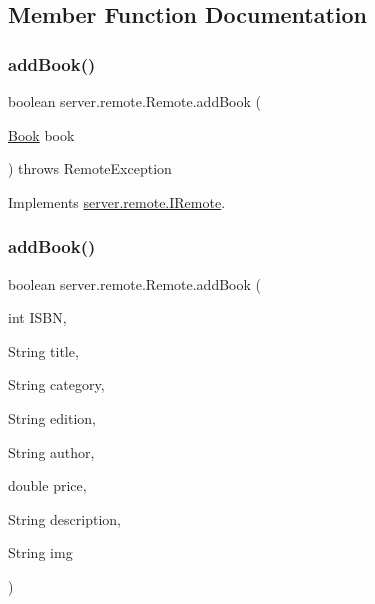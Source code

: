 \subsection{Member Function Documentation}
\mbox{\label{classserver_1_1remote_1_1_remote_a496fcecd259c1b527ffba62fc452afee}} 
\subsubsection{\texorpdfstring{add\+Book()}{addBook()}\hspace{0.1cm}{\footnotesize\ttfamily [1/2]}}
{\footnotesize\ttfamily boolean server.\+remote.\+Remote.\+add\+Book (\begin{DoxyParamCaption}\item[{\hyperlink{classserver_1_1data_1_1_book}{Book}}]{book }\end{DoxyParamCaption}) throws Remote\+Exception}



Implements \hyperlink{interfaceserver_1_1remote_1_1_i_remote_a3b11a0e182873e445ec8546394e36373}{server.\+remote.\+I\+Remote}.

\mbox{\label{classserver_1_1remote_1_1_remote_afd807d8743560106c61a01094795c9cb}} 
\subsubsection{\texorpdfstring{add\+Book()}{addBook()}\hspace{0.1cm}{\footnotesize\ttfamily [2/2]}}
{\footnotesize\ttfamily boolean server.\+remote.\+Remote.\+add\+Book (\begin{DoxyParamCaption}\item[{int}]{I\+S\+BN,  }\item[{String}]{title,  }\item[{String}]{category,  }\item[{String}]{edition,  }\item[{String}]{author,  }\item[{double}]{price,  }\item[{String}]{description,  }\item[{String}]{img }\end{DoxyParamCaption})}

